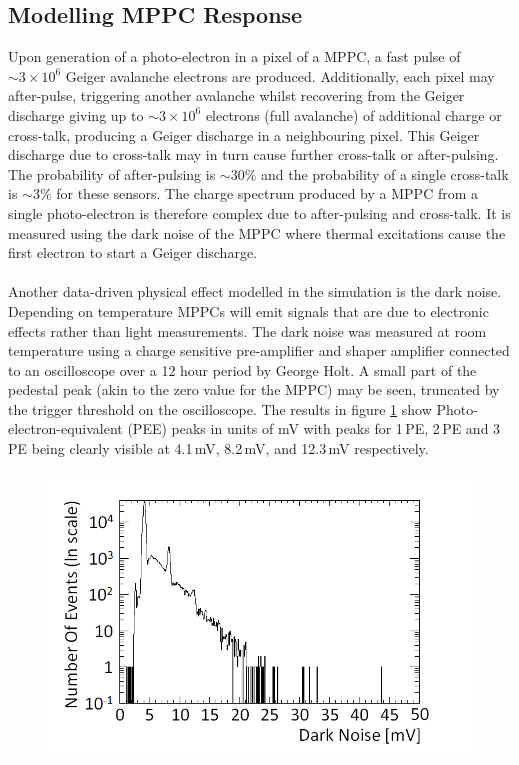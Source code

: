 \subsection{Modelling MPPC Response}\label{sec:GEANT4Simulation_ModellingDarkNoise}
Upon generation of a photo-electron in a pixel of a MPPC, a fast pulse of $\sim 3 \times 10^6$ Geiger avalanche electrons are produced. Additionally, each pixel may after-pulse, triggering another avalanche  whilst recovering
from the Geiger discharge giving up to $\sim 3 \times 10^6$ electrons (full avalanche)  of additional charge or cross-talk, producing a Geiger discharge in a neighbouring pixel. This Geiger discharge due to cross-talk may in turn cause further cross-talk or after-pulsing. The probability of after-pulsing is $\sim 30 \%$ and the probability of a single cross-talk is $\sim 3 \%$ for these sensors. The charge spectrum produced by a MPPC from a single photo-electron is therefore complex due to after-pulsing and cross-talk. It is measured using the dark noise of the MPPC where thermal excitations cause the first electron to start a Geiger discharge.
\\\\Another data-driven physical effect modelled in the simulation is the dark noise. Depending on temperature MPPCs will emit signals that are due to electronic effects rather than light measurements. The dark noise was measured at room temperature using a charge sensitive pre-amplifier and shaper amplifier connected to an oscilloscope  over a 12 hour period by George Holt. A small part of the pedestal peak (akin to the zero value for the MPPC) may be seen, truncated by the trigger threshold on the oscilloscope. The results in figure \ref{fig:pureDarkNoise} show Photo-electron-equivalent (PEE) peaks in units of mV with peaks for 1\,PE, 2\,PE and 3\,PE being clearly visible at 4.1\,mV, 8.2\,mV, and 12.3\,mV respectively. 
\begin{figure}[!h]
 \centering
 \includegraphics[width=0.7\linewidth]{Chapter4/Figs/Raster/pureDarkNoise_outputMedText.png}
 \label{fig:pureDarkNoise}
\end{figure}
